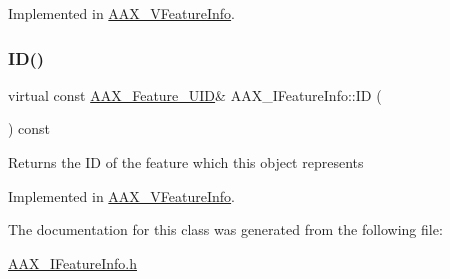 Implemented in \mbox{\hyperlink{a01917_a021eb7c27054e8ee67dbc0f8d314960c}{A\+A\+X\+\_\+\+V\+Feature\+Info}}.

\mbox{\label{a01829_aec2b87eadca9e5d55d7b93163b5ee1da}} 
\subsubsection{\texorpdfstring{ID()}{ID()}}
{\footnotesize\ttfamily virtual const \mbox{\hyperlink{a00392_a53d6cf8a08224b3e813333e411ce798e}{A\+A\+X\+\_\+\+Feature\+\_\+\+U\+ID}}\& A\+A\+X\+\_\+\+I\+Feature\+Info\+::\+ID (\begin{DoxyParamCaption}{ }\end{DoxyParamCaption}) const\hspace{0.3cm}{\ttfamily [pure virtual]}}

Returns the ID of the feature which this object represents 

Implemented in \mbox{\hyperlink{a01917_ae561b74fa6ff031140d67a4f26030669}{A\+A\+X\+\_\+\+V\+Feature\+Info}}.



The documentation for this class was generated from the following file\+:\begin{DoxyCompactItemize}
\item 
\mbox{\hyperlink{a00602}{A\+A\+X\+\_\+\+I\+Feature\+Info.\+h}}\end{DoxyCompactItemize}
